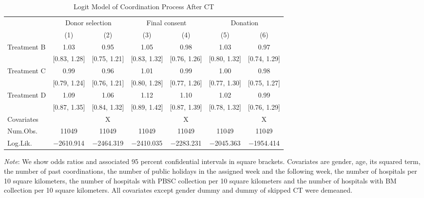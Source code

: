 \documentclass[12pt, a4paper]{article}
\begin{document}
\begin{table}[H]

\caption{\label{tab:logit-coordinate}Logit Model of Coordination Process After CT}
\centering
\fontsize{8}{10}\selectfont
\begin{threeparttable}
\begin{tabular}[t]{lcccccc}
\toprule
\multicolumn{1}{c}{ } & \multicolumn{2}{c}{Donor selection} & \multicolumn{2}{c}{Final consent} & \multicolumn{2}{c}{Donation} \\
\cmidrule(l{3pt}r{3pt}){2-3} \cmidrule(l{3pt}r{3pt}){4-5} \cmidrule(l{3pt}r{3pt}){6-7}
  & (1) & (2) & (3) & (4) & (5) & (6)\\
\midrule
Treatment B & \num{1.03} & \num{0.95} & \num{1.05} & \num{0.98} & \num{1.03} & \num{0.97}\\
 & {}[\num{0.83}, \num{1.28}] & {}[\num{0.75}, \num{1.21}] & {}[\num{0.83}, \num{1.32}] & {}[\num{0.76}, \num{1.26}] & {}[\num{0.80}, \num{1.32}] & {}[\num{0.74}, \num{1.29}]\\
Treatment C & \num{0.99} & \num{0.96} & \num{1.01} & \num{0.99} & \num{1.00} & \num{0.98}\\
 & {}[\num{0.79}, \num{1.24}] & {}[\num{0.76}, \num{1.21}] & {}[\num{0.80}, \num{1.28}] & {}[\num{0.77}, \num{1.26}] & {}[\num{0.77}, \num{1.30}] & {}[\num{0.75}, \num{1.27}]\\
Treatment D & \num{1.09} & \num{1.06} & \num{1.12} & \num{1.10} & \num{1.02} & \num{0.99}\\
 & {}[\num{0.87}, \num{1.35}] & {}[\num{0.84}, \num{1.32}] & {}[\num{0.89}, \num{1.42}] & {}[\num{0.87}, \num{1.39}] & {}[\num{0.78}, \num{1.32}] & {}[\num{0.76}, \num{1.29}]\\
\midrule
Covariates &  & X &  & X &  & X\\
Num.Obs. & \num{11049} & \num{11049} & \num{11049} & \num{11049} & \num{11049} & \num{11049}\\
Log.Lik. & \num{-2610.914} & \num{-2464.319} & \num{-2410.035} & \num{-2283.231} & \num{-2045.363} & \num{-1954.414}\\
\bottomrule
\end{tabular}
\begin{tablenotes}
\item \emph{Note}: We show odds ratios and associated 95 percent confidential intervals in square brackets. Covariates are gender, age, its squared term, the number of past coordinations, the number of public holidays in the assigned week and the following week, the number of hospitals per 10 square kilometers, the number of hospitals with PBSC collection per 10 square kilometers and the number of hospitals with BM collection per 10 square kilometers. All covariates except gender dummy and dummy of skipped CT were demeaned.
\end{tablenotes}
\end{threeparttable}
\end{table}
\end{document}
